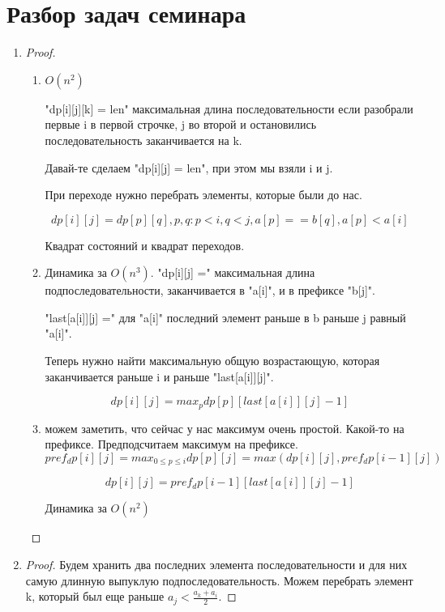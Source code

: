 \section{Разбор задач семинара}

\begin{enumerate}
\item 
    \begin{proof}
    \begin{enumerate}
    \item 
    $O(n^2)$

    \cpp"dp[i][j][k] = len" максимальная длина последовательности если 
    разобрали первые i в первой строчке, j во второй и остановились последовательность заканчивается на k.

    Давай-те сделаем \cpp"dp[i][j] = len", при этом мы взяли i и j.

    При переходе нужно перебрать элементы, которые были до нас.

    $$dp[i][j] = dp[p][q], p, q\colon p < i, q < j, a[p] == b[q], a[p] < a[i]$$

    Квадрат состояний и квадрат переходов.
    \item

    Динамика за $O(n^3)$.
    \cpp"dp[i][j] =" максимальная длина подпоследовательности, заканчивается в \cpp"a[i]", и в префиксе \cpp"b[j]".

    \cpp"last[a[i]][j] =" для \cpp"a[i]" последний элемент раньше в b раньше j равный \cpp"a[i]".

    Теперь нужно найти максимальную общую возрастающую, которая заканчивается раньше i и раньше
    \cpp"last[a[i]][j]".

    $$dp[i][j] = max_p dp[p][last[a[i]][j] - 1]$$ 

    \item можем заметить, что сейчас у нас максимум очень простой. Какой-то на префиксе. Предподсчитаем
    максимум на префиксе.  $$pref_dp[i][j] = max_{0 \le p \le i} dp[p][j] = max(dp[i][j], pref_dp[i - 1][j])$$

    $$dp[i][j] = pref_dp[i - 1][last[a[i]][j] - 1]$$ 
    
    Динамика за $O(n^2)$
    \end{enumerate}
    \end{proof}
\item   
    \begin{proof}
    Будем хранить два последних элемента последовательности и для них самую длинную 
    выпуклую подпоследовательность. Можем перебрать элемент k, который был еще раньше $a_j < \frac{a_k + a_i}{2}$.


\end{proof}
\end{enumerate}
